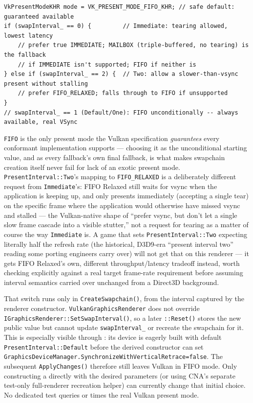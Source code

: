 \begin{lstlisting}
VkPresentModeKHR mode = VK_PRESENT_MODE_FIFO_KHR; // safe default: guaranteed available
if (swapInterval_ == 0) {         // Immediate: tearing allowed, lowest latency
    // prefer true IMMEDIATE; MAILBOX (triple-buffered, no tearing) is the fallback
    // if IMMEDIATE isn't supported; FIFO if neither is
} else if (swapInterval_ == 2) {  // Two: allow a slower-than-vsync present without stalling
    // prefer FIFO_RELAXED; falls through to FIFO if unsupported
}
// swapInterval_ == 1 (Default/One): FIFO unconditionally -- always available, real VSync
\end{lstlisting}

\texttt{FIFO} is the only present mode the Vulkan specification \emph{guarantees} every
conformant implementation supports --- choosing it as the unconditional starting value, and as
every fallback's own final fallback, is what makes swapchain creation itself never fail for
lack of an exotic present mode. \texttt{PresentInterval::Two}'s mapping
to \texttt{FIFO\_RELAXED} is a deliberately different request from \texttt{Immediate}'s: FIFO
Relaxed still waits for vsync when the application is keeping up, and only presents
immediately (accepting a single tear) on the specific frame where the application would
otherwise have missed vsync and stalled --- the Vulkan-native shape of ``prefer vsync, but
don't let a single slow frame cascade into a visible stutter,'' not a request for tearing as a
matter of course the way \texttt{Immediate} is. A game that sets \texttt{PresentInterval::Two}
expecting literally half the refresh rate (the historical, D3D9-era ``present interval two''
reading some porting engineers carry over) will not get that on this renderer --- it gets FIFO
Relaxed's own, different throughput/latency tradeoff instead, worth checking explicitly against
a real target frame-rate requirement before assuming interval semantics carried over unchanged
from a Direct3D background.

\begin{sourcenote}
That switch runs only in \texttt{CreateSwapchain()}, from the interval captured by the
renderer constructor. \texttt{VulkanGraphics\allowbreak Renderer} does not override
\texttt{IGraphicsRenderer::SetSwap\allowbreak Interval()}, so a later
\texttt{::Reset()} stores the new public value but cannot update
\texttt{swapInterval\_} or recreate the swapchain for it. This is especially visible through
: its device is eagerly built with default \texttt{PresentInterval::Default}
before the derived constructor can set
\texttt{GraphicsDevice\allowbreak Manager.SynchronizeWith\allowbreak VerticalRetrace=false}.
The subsequent
\texttt{ApplyChanges()} therefore still leaves Vulkan in FIFO mode. Only constructing a
 directly with the desired parameters (or using CNA's separate
test-only full-renderer recreation helper) can currently change that initial choice. No
dedicated test queries or times the real Vulkan present mode.
\end{sourcenote}

